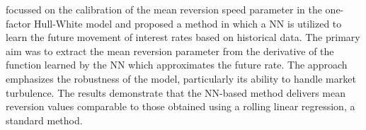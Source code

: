 \textcite{moysiadis2019calibrating} focussed on the calibration of the mean reversion speed parameter in the one-factor Hull-White model and proposed a method in which a NN is utilized to learn the future movement of interest rates based on historical data. The primary aim was to extract the mean reversion parameter from the derivative of the function learned by the NN which approximates the future rate. The approach emphasizes the robustness of the model, particularly its ability to handle market turbulence. The results demonstrate that the NN-based method delivers mean reversion values comparable to those obtained using a rolling linear regression, a standard method.